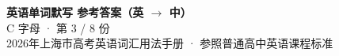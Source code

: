 \documentclass[10pt,a4paper]{article}
\begin{document}
\pagestyle{plain}

\begin{center}
{\LARGE\bfseries 英语单词默写 \quad 参考答案（英 $\to$ 中）}\\[0.22em]
{\large C 字母 · 第 3 / 8 份}\\[0.18em]
{\small 2026年上海市高考英语词汇用法手册 · 参照普通高中英语课程标准}
\end{center}

\vspace{0.2em}
\noindent{\color{rulegray}\rule{\textwidth}{0.8pt}}

\vspace{0.35em}

\vspace{0.25em}
\renewcommand{\arraystretch}{1.32}
\end{document}
